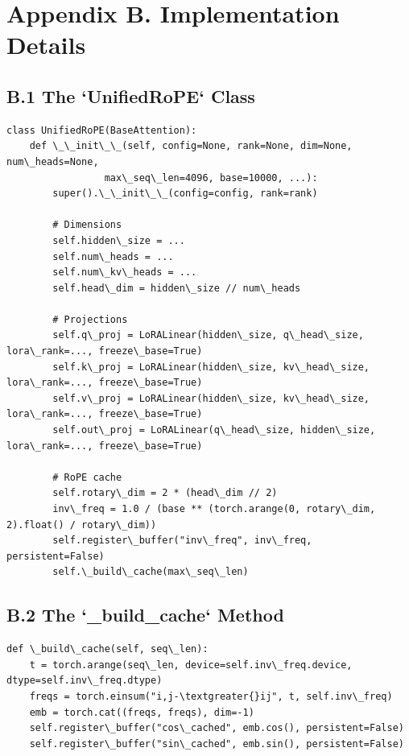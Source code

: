 
\section{Appendix B. Implementation Details}

\subsection{B.1 The `UnifiedRoPE` Class}

\begin{lstlisting}
class UnifiedRoPE(BaseAttention):
    def \_\_init\_\_(self, config=None, rank=None, dim=None, num\_heads=None,
                 max\_seq\_len=4096, base=10000, ...):
        super().\_\_init\_\_(config=config, rank=rank)
        
        # Dimensions
        self.hidden\_size = ...
        self.num\_heads = ...
        self.num\_kv\_heads = ...
        self.head\_dim = hidden\_size // num\_heads
        
        # Projections
        self.q\_proj = LoRALinear(hidden\_size, q\_head\_size, lora\_rank=..., freeze\_base=True)
        self.k\_proj = LoRALinear(hidden\_size, kv\_head\_size, lora\_rank=..., freeze\_base=True)
        self.v\_proj = LoRALinear(hidden\_size, kv\_head\_size, lora\_rank=..., freeze\_base=True)
        self.out\_proj = LoRALinear(q\_head\_size, hidden\_size, lora\_rank=..., freeze\_base=True)
        
        # RoPE cache
        self.rotary\_dim = 2 * (head\_dim // 2)
        inv\_freq = 1.0 / (base ** (torch.arange(0, rotary\_dim, 2).float() / rotary\_dim))
        self.register\_buffer("inv\_freq", inv\_freq, persistent=False)
        self.\_build\_cache(max\_seq\_len)
\end{lstlisting}

\subsection{B.2 The `\_build\_cache` Method}

\begin{lstlisting}
def \_build\_cache(self, seq\_len):
    t = torch.arange(seq\_len, device=self.inv\_freq.device, dtype=self.inv\_freq.dtype)
    freqs = torch.einsum("i,j-\textgreater{}ij", t, self.inv\_freq)
    emb = torch.cat((freqs, freqs), dim=-1)
    self.register\_buffer("cos\_cached", emb.cos(), persistent=False)
    self.register\_buffer("sin\_cached", emb.sin(), persistent=False)
\end{lstlisting}

